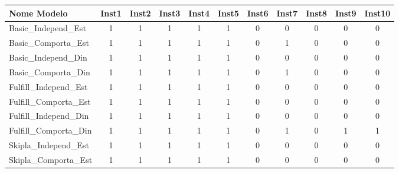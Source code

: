 \begin{table}[H]
	\centering
	\footnotesize
	\begin{tabular}{@{}lcccccccccc@{}}
		\toprule
		\textbf{Nome Modelo}   & \textbf{Inst1} & \textbf{Inst2} & \textbf{Inst3} & \textbf{Inst4} & \textbf{Inst5} & \textbf{Inst6} & \textbf{Inst7} & \textbf{Inst8} & \textbf{Inst9} & \textbf{Inst10} \\
		\midrule
		Basic\_Independ\_Est   & 1              & 1              & 1              & 1              & 1              & 0              & 0              & 0              & 0              & 0               \\
		Basic\_Comporta\_Est   & 1              & 1              & 1              & 1              & 1              & 0              & 1              & 0              & 0              & 0               \\
		Basic\_Independ\_Din   & 1              & 1              & 1              & 1              & 1              & 0              & 0              & 0              & 0              & 0               \\
		Basic\_Comporta\_Din   & 1              & 1              & 1              & 1              & 1              & 0              & 1              & 0              & 0              & 0               \\  \hline
		Fulfill\_Independ\_Est & 1              & 1              & 1              & 1              & 1              & 0              & 0              & 0              & 0              & 0               \\
		Fulfill\_Comporta\_Est & 1              & 1              & 1              & 1              & 1              & 0              & 0              & 0              & 0              & 0               \\
		Fulfill\_Independ\_Din & 1              & 1              & 1              & 1              & 1              & 0              & 0              & 0              & 0              & 0               \\
		Fulfill\_Comporta\_Din & 1              & 1              & 1              & 1              & 1              & 0              & 1              & 0              & 1              & 1               \\  \hline
		Skipla\_Independ\_Est  & 1              & 1              & 1              & 1              & 1              & 0              & 0              & 0              & 0              & 0               \\
		Skipla\_Comporta\_Est  & 1              & 1              & 1              & 1              & 1              & 0              & 0              & 0              & 0              & 0               \\

\end{tabular}
\end{table}
